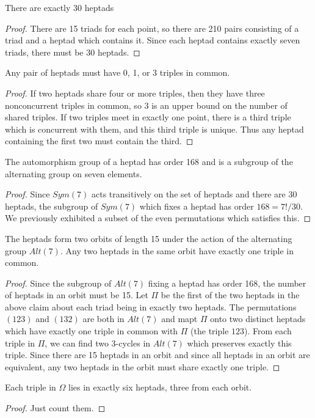 \begin{claim}
	There are exactly 30 heptads
\end{claim}
\begin{proof}
	There are 15 triads for each point, so there are 210 pairs consisting of a triad and a heptad which contains it.  Since each heptad contains exactly seven triads, there must be 30 heptads.
\end{proof}
\begin{claim}
	Any pair of heptads must have 0, 1, or 3 triples in common.
\end{claim}
\begin{proof}
	If two heptads share four or more triples, then they have three nonconcurrent triples in common, so 3 is an upper bound on the number of shared triples.  If two triples meet in exactly one point, there is a third triple which is concurrent with them, and this third triple is unique.  Thus any heptad containing the first two must contain the third.
\end{proof}
\begin{claim}
	The automorphism group of a heptad has order 168 and is a subgroup of the alternating group on seven elements.
\end{claim}
\begin{proof}
	Since $Sym(7)$ acts transitively on the set of heptads and there are 30 heptads, the subgroup of $Sym(7)$ which fixes a heptad has order $168=7!/30$.  We previously exhibited a subset of the even permutations which satisfies this.
\end{proof}

\begin{claim}
	The heptads form two orbits of length 15 under the action of the alternating group $Alt(7)$.  Any two heptads in the same orbit have exactly one triple in common.
\end{claim}
\begin{proof}
	Since the subgroup of $Alt(7)$ fixing a heptad has order 168, the number of heptads in an orbit must be 15.  Let $\Pi$ be the first of the two heptads in the above claim about each triad being in exactly two heptads.  The permutations $(123)$ and $(132)$ are both in $Alt(7)$ and mapt $\Pi$ onto two distinct heptads which have exactly one triple in common with $\Pi$ (the triple $123$).  From each triple in $\Pi$, we can find two 3-cycles in $Alt(7)$ which preserves exactly this triple.  Since there are 15 heptads in an orbit and since all heptads in an orbit are equivalent, any two heptads in the orbit must share exactly one triple.
	
\end{proof}
\begin{claim}
	{Each triple in $\Omega$ lies in exactly six heptads, three from each orbit.}
\end{claim}
\begin{proof}
	Just count them.
\end{proof}

